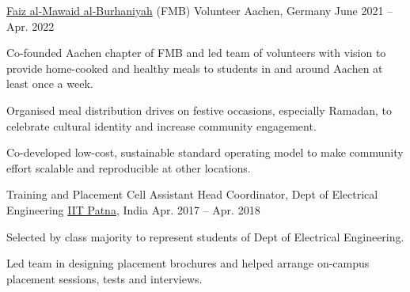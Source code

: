 
\begin{cvpositions}

\cvrole
	{\href{https://www.thedawoodibohras.com/about-the-bohras/faiz-al-mawaid-al-burhaniyah/}{Faiz al-Mawaid al-Burhaniyah} (FMB)} %
	{Volunteer} %
	{Aachen, Germany\acvHeaderIconSep{}} %
	{June 2021 -- Apr. 2022} %
	{\begin{cvitems} %
		\item {Co-founded Aachen chapter of FMB and led team of volunteers with vision to provide home-cooked and healthy meals to students in and around Aachen at least once a week.}
		\item {Organised meal distribution drives on festive occasions, especially Ramadan, to celebrate cultural identity and increase community engagement.}
		\item {Co-developed low-cost, sustainable standard operating model to make community effort scalable and reproducible at other locations.}
	\end{cvitems}}

\cvrole
	{Training and Placement Cell} %
	{Assistant Head Coordinator, Dept of Electrical Engineering} %
	{\href{https://www.iitp.ac.in}{IIT Patna}, India\acvHeaderIconSep{}} %
	{Apr. 2017 -- Apr. 2018} %
	{\begin{cvitems} %
		\item {Selected by class majority to represent students of Dept of Electrical Engineering.}
		\item {Led team in designing placement brochures and helped arrange on-campus placement sessions, tests and interviews.}
	\end{cvitems}}


\end{cvpositions}
